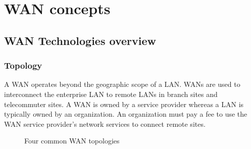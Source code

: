 \chapter{WAN concepts}

\section{WAN Technologies overview}

\subsection{Topology}

A WAN operates beyond the geographic scope of a LAN. WANs are used to interconnect the enterprise LAN to remote LANs in branch sites and telecommuter sites. A WAN is owned by a service provider whereas a LAN is typically owned by an organization. An organization must pay a fee to use the WAN service provider’s network services to connect remote sites.\\

\begin{figure}[hbtp]
\centering
{}\label{WANtopology1}
\label{WANtopology2}
\label{WANtopology3}
\label{WANtopology4}
\caption{Four common WAN topologies}
\end{figure}

